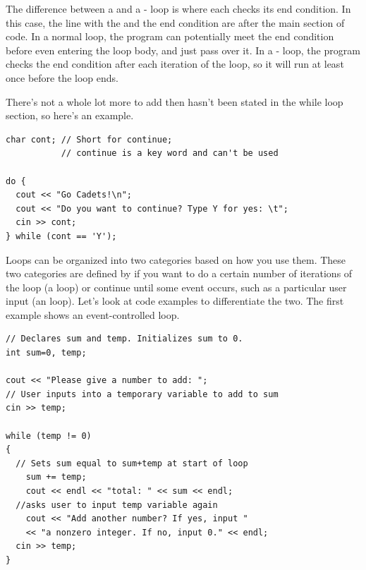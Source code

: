The difference between a  and a - loop is where each checks its end condition.
In this case, the line with the  and the end condition are after the main section of code.
In a normal  loop, the program can potentially meet the end condition before even entering the loop body, and just pass over it.
In a - loop, the program checks the end condition after each iteration of the loop, so it will run at least once before the loop ends.

There's not a whole lot more to add then hasn't been stated in the while loop section, so here's an example.

\noindent\begin{minipage}{\linewidth}\begin{lstlisting}
char cont; // Short for continue; 
           // continue is a key word and can't be used

do {
  cout << "Go Cadets!\n";
  cout << "Do you want to continue? Type Y for yes: \t";
  cin >> cont;
} while (cont == 'Y');
\end{lstlisting}\end{minipage}


Loops can be organized into two categories based on how you use them.
These two categories are defined by if you want to do a certain number of iterations of the loop (a  loop) or continue until some event occurs, such as a particular user input (an  loop).
Let's look at code examples to differentiate the two. The first example shows an event-controlled  loop.

\noindent\begin{minipage}{\linewidth}\begin{lstlisting}
// Declares sum and temp. Initializes sum to 0.
int sum=0, temp; 

cout << "Please give a number to add: ";
// User inputs into a temporary variable to add to sum
cin >> temp;	

while (temp != 0) 
{
  // Sets sum equal to sum+temp at start of loop
	sum += temp;	
	cout << endl << "total: " << sum << endl;	
  //asks user to input temp variable again
	cout << "Add another number? If yes, input "
    << "a nonzero integer. If no, input 0." << endl;	
  cin >> temp;
}
\end{lstlisting}\end{minipage}

